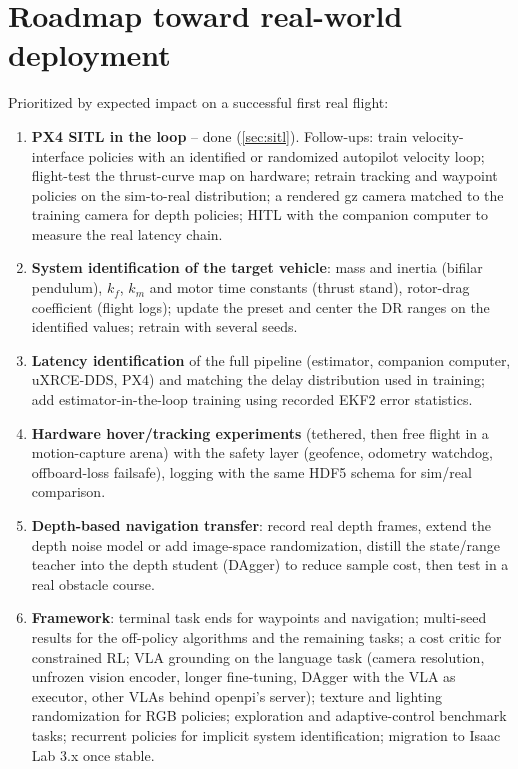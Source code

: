 \documentclass[11pt,a4paper]{article}
\begin{document}
\section{Roadmap toward real-world deployment}\label{sec:roadmap}
Prioritized by expected impact on a successful first real flight:
\begin{enumerate}
\item \textbf{PX4 SITL in the loop} -- done (\cref{sec:sitl}). Follow-ups: train velocity-interface policies with an
identified or randomized autopilot velocity loop; flight-test the thrust-curve map on hardware; retrain tracking and
waypoint policies on the sim-to-real distribution; a rendered gz camera matched to the training camera for depth policies;
HITL with the companion computer to measure the real latency chain.
\item \textbf{System identification of the target vehicle}: mass and inertia (bifilar pendulum), $k_f$, $k_m$ and motor
time constants (thrust stand), rotor-drag coefficient (flight logs); update the preset and center the DR ranges on the
identified values; retrain with several seeds.
\item \textbf{Latency identification} of the full pipeline (estimator, companion computer, uXRCE-DDS, PX4) and matching
the delay distribution used in training; add estimator-in-the-loop training using recorded EKF2 error statistics.
\item \textbf{Hardware hover/tracking experiments} (tethered, then free flight in a motion-capture arena) with the
safety layer (geofence, odometry watchdog, offboard-loss failsafe), logging with the same HDF5 schema for
sim/real comparison.
\item \textbf{Depth-based navigation transfer}: record real depth frames, extend the depth noise model or add
image-space randomization, distill the state/range teacher into the depth student (DAgger) to reduce sample cost,
then test in a real obstacle course.
\item \textbf{Framework}: terminal task ends for waypoints and navigation; multi-seed results for the
off-policy algorithms and the remaining tasks; a cost critic for constrained RL;
VLA grounding on the language task (camera resolution, unfrozen vision encoder, longer fine-tuning, DAgger with the
VLA as executor, other VLAs behind openpi's server); texture and lighting
randomization for RGB policies; exploration and adaptive-control benchmark tasks; recurrent policies for implicit
system identification; migration to Isaac Lab 3.x once stable.
\end{enumerate}
\end{document}

